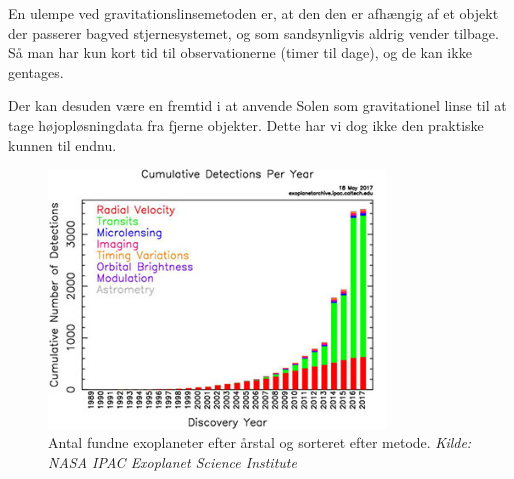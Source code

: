 En ulempe ved gravitationslinsemetoden er, at den den er afhængig af et objekt der passerer bagved stjernesystemet, og som sandsynligvis aldrig vender tilbage. Så man har kun kort tid til observationerne (timer til dage), og de kan ikke gentages.

Der kan desuden være en fremtid i at anvende Solen som gravitationel linse til at tage højopløsningdata fra fjerne objekter. Dette har vi dog ikke den praktiske kunnen til endnu.




\begin{figure}[h!]
    \centering
    \includegraphics[width = 0.8\textwidth]{Astrofysik/billeder/AntalFundne.jpg}  
    \caption{Antal fundne exoplaneter efter årstal og sorteret efter metode. \textit{Kilde: NASA IPAC Exoplanet Science Institute}}
    \label{antal_fundne}
\end{figure}

